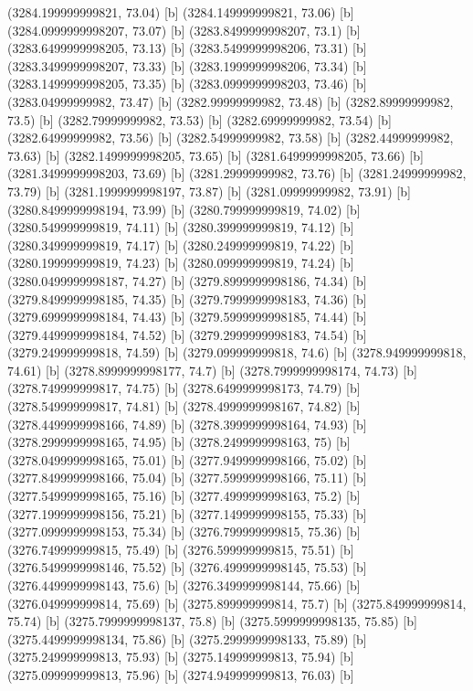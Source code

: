 {{{(3284.199999999821, 73.04) [b] 
(3284.149999999821, 73.06) [b] 
(3284.0999999998207, 73.07) [b] 
(3283.8499999998207, 73.1) [b] 
(3283.6499999998205, 73.13) [b] 
(3283.5499999998206, 73.31) [b] 
(3283.3499999998207, 73.33) [b] 
(3283.1999999998206, 73.34) [b] 
(3283.1499999998205, 73.35) [b] 
(3283.0999999998203, 73.46) [b] 
(3283.04999999982, 73.47) [b] 
(3282.99999999982, 73.48) [b] 
(3282.89999999982, 73.5) [b] 
(3282.79999999982, 73.53) [b] 
(3282.69999999982, 73.54) [b] 
(3282.64999999982, 73.56) [b] 
(3282.54999999982, 73.58) [b] 
(3282.44999999982, 73.63) [b] 
(3282.1499999998205, 73.65) [b] 
(3281.6499999998205, 73.66) [b] 
(3281.3499999998203, 73.69) [b] 
(3281.29999999982, 73.76) [b] 
(3281.24999999982, 73.79) [b] 
(3281.1999999998197, 73.87) [b] 
(3281.09999999982, 73.91) [b] 
(3280.8499999998194, 73.99) [b] 
(3280.799999999819, 74.02) [b] 
(3280.549999999819, 74.11) [b] 
(3280.399999999819, 74.12) [b] 
(3280.349999999819, 74.17) [b] 
(3280.249999999819, 74.22) [b] 
(3280.199999999819, 74.23) [b] 
(3280.099999999819, 74.24) [b] 
(3280.0499999998187, 74.27) [b] 
(3279.8999999998186, 74.34) [b] 
(3279.8499999998185, 74.35) [b] 
(3279.7999999998183, 74.36) [b] 
(3279.6999999998184, 74.43) [b] 
(3279.5999999998185, 74.44) [b] 
(3279.4499999998184, 74.52) [b] 
(3279.2999999998183, 74.54) [b] 
(3279.249999999818, 74.59) [b] 
(3279.099999999818, 74.6) [b] 
(3278.949999999818, 74.61) [b] 
(3278.8999999998177, 74.7) [b] 
(3278.7999999998174, 74.73) [b] 
(3278.749999999817, 74.75) [b] 
(3278.6499999998173, 74.79) [b] 
(3278.549999999817, 74.81) [b] 
(3278.4999999998167, 74.82) [b] 
(3278.4499999998166, 74.89) [b] 
(3278.3999999998164, 74.93) [b] 
(3278.2999999998165, 74.95) [b] 
(3278.2499999998163, 75) [b] 
(3278.0499999998165, 75.01) [b] 
(3277.9499999998166, 75.02) [b] 
(3277.8499999998166, 75.04) [b] 
(3277.5999999998166, 75.11) [b] 
(3277.5499999998165, 75.16) [b] 
(3277.4999999998163, 75.2) [b] 
(3277.1999999998156, 75.21) [b] 
(3277.1499999998155, 75.33) [b] 
(3277.0999999998153, 75.34) [b] 
(3276.799999999815, 75.36) [b] 
(3276.749999999815, 75.49) [b] 
(3276.599999999815, 75.51) [b] 
(3276.5499999998146, 75.52) [b] 
(3276.4999999998145, 75.53) [b] 
(3276.4499999998143, 75.6) [b] 
(3276.3499999998144, 75.66) [b] 
(3276.049999999814, 75.69) [b] 
(3275.899999999814, 75.7) [b] 
(3275.849999999814, 75.74) [b] 
(3275.7999999998137, 75.8) [b] 
(3275.5999999998135, 75.85) [b] 
(3275.4499999998134, 75.86) [b] 
(3275.2999999998133, 75.89) [b] 
(3275.249999999813, 75.93) [b] 
(3275.149999999813, 75.94) [b] 
(3275.099999999813, 75.96) [b] 
(3274.949999999813, 76.03) [b] 
}}}
